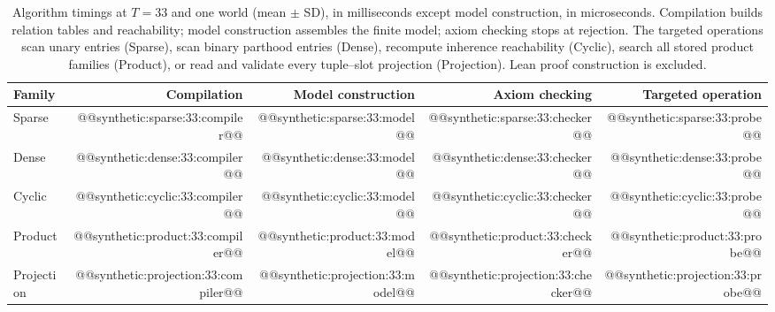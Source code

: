 \begin{table}[htbp]
  \caption{Algorithm timings at $T=33$ and one world (mean $\pm$ SD), in milliseconds except model construction, in microseconds. Compilation builds relation tables and reachability; model construction assembles the finite model; axiom checking stops at rejection. The targeted operations scan unary  entries (Sparse), scan binary parthood entries (Dense), recompute inherence reachability (Cyclic), search all stored product families (Product), or read and validate every tuple--slot projection (Projection). Lean proof construction is excluded.}\label{tab:stage-times}
  \centering
  \small
  \setlength{\tabcolsep}{3pt}
  \begin{tabular}{@{}lrrrr@{}}
    \toprule Family & Compilation       & Model construction & Axiom checking   & Targeted operation    \\\midrule
    Sparse          & @@synthetic:sparse:33:compiler@@ & @@synthetic:sparse:33:model@@ & @@synthetic:sparse:33:checker@@ & @@synthetic:sparse:33:probe@@ \\
    Dense           & @@synthetic:dense:33:compiler@@ & @@synthetic:dense:33:model@@ & @@synthetic:dense:33:checker@@ & @@synthetic:dense:33:probe@@ \\
    Cyclic          & @@synthetic:cyclic:33:compiler@@ & @@synthetic:cyclic:33:model@@ & @@synthetic:cyclic:33:checker@@ & @@synthetic:cyclic:33:probe@@ \\
    Product         & @@synthetic:product:33:compiler@@ & @@synthetic:product:33:model@@ & @@synthetic:product:33:checker@@ & @@synthetic:product:33:probe@@ \\
    Projection      & @@synthetic:projection:33:compiler@@ & @@synthetic:projection:33:model@@ & @@synthetic:projection:33:checker@@ & @@synthetic:projection:33:probe@@ \\
    \bottomrule
  \end{tabular}
\end{table}
